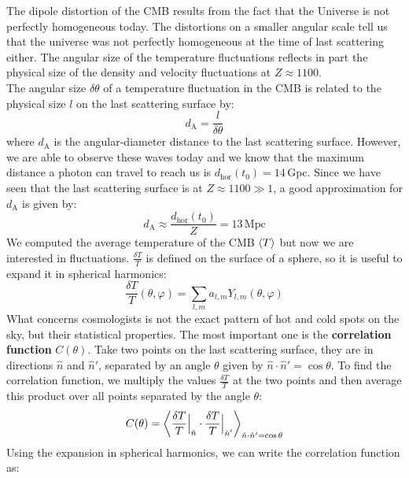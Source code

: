 \documentclass[10.75pt,a4paper,openright,bottom=2cm]{article}
\begin{document}
The dipole distortion of the CMB results from the fact that the Universe is not perfectly homogeneous today. The distortions on a smaller angular scale tell us that the universe was not perfectly homogeneous at the time of last scattering either. The angular size of the temperature fluctuations reflects in part the physical size of the density
and velocity fluctuations at $Z\approx1100$.\\
The angular size $\delta\theta$ of a temperature fluctuation in the CMB is related to the physical size $l$ on the last scattering surface by:
\[
d_{\text{A}}=\frac{l}{\delta\theta}
\]
where $d_{\text{A}}$ is the angular-diameter distance to the last scattering surface. However, we are able to observe these waves today and we know that the maximum distance a photon can travel to reach us is $d_{\text{hor}}(t_0)=14$\,Gpc. Since we have seen that the last scattering surface is at $Z\approx1100\gg1$, a good approximation for $d_{\text{A}}$ is given by:
\[
d_{\text{A}}\approx\frac{d_{\text{hor}}(t_0)}{Z}=13\,\text{Mpc}
\]
We computed the average temperature of the CMB $\Braket{T}$ but now we are interested in fluctuations. $\frac{\delta T}{T}$ is defined on the surface of a sphere, so it is useful to expand it in spherical harmonics:
\[
\frac{\delta T}{T}(\theta,\varphi)=\sum_{l,m}a_{l,m}Y_{l,m}(\theta,\varphi)
\]
What concerns cosmologists is not the exact pattern of hot and cold spots on the sky, but their statistical properties. The most important one is the \textbf{correlation function} $C(\theta)$. Take two points on the last scattering surface, they are in directions $\hat{n}$ and $\hat{n}'$, separated by an angle $\theta$ given by $\hat{n}\cdot\hat{n}'=\cos\theta$. To find the correlation function, we multiply the values $\frac{\delta T}{T}$ at the two points and then average this product over all points separated by the angle $\theta$:
\[
C(\theta)=\Braket{\frac{\delta T}{T}\Bigr|_{\substack{\hat{n}}}\cdot\frac{\delta T}{T}\Bigr|_{\substack{\hat{n}'}}}_{\hat{n}\cdot\hat{n}'=\cos\theta}
\]
Using the expansion in spherical harmonics, we can write the correlation function as:
\end{document}
